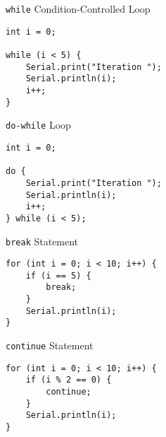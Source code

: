 \documentclass[sectionframe]{oxblue-beamer}
\begin{document}
\begin{frame}[fragile]{\texttt{while} Condition-Controlled Loop}
\begin{verbatim}
int i = 0;

while (i < 5) {
    Serial.print("Iteration ");
    Serial.println(i);
    i++;
}
\end{verbatim}
\end{frame}

\begin{frame}[fragile]{\texttt{do-while} Loop}
\begin{verbatim}
int i = 0;

do {
    Serial.print("Iteration ");
    Serial.println(i);
    i++;
} while (i < 5);
\end{verbatim}
\end{frame}

\begin{frame}[fragile]{\texttt{break} Statement}
\begin{verbatim}
for (int i = 0; i < 10; i++) {
    if (i == 5) {
        break;
    }
    Serial.println(i);
}
\end{verbatim}
\end{frame}

\begin{frame}[fragile]{\texttt{continue} Statement}
\begin{verbatim}
for (int i = 0; i < 10; i++) {
    if (i % 2 == 0) {
        continue;
    }
    Serial.println(i);
}
\end{verbatim}
\end{frame}
\end{document}
